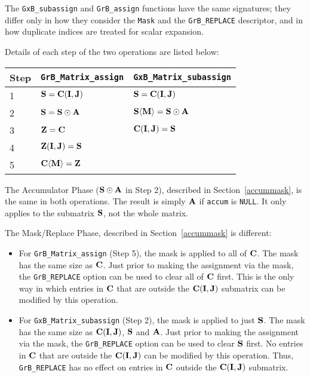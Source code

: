 \documentclass[12pt]{article}
\begin{document}
The \verb'GxB_subassign' and \verb'GrB_assign' functions have the same
signatures; they differ only in how they consider the \verb'Mask' and the
\verb'GrB_REPLACE' descriptor, and in how duplicate indices are treated for
scalar expansion.

Details of each step of the two operations are listed below:

\vspace{0.1in}
\begin{tabular}{lll}
\hline
Step & \verb'GrB_Matrix_assign'                & \verb'GxB_Matrix_subassign'                        \\
\hline
1 & ${\bf S} = {\bf C(I,J)}$                & ${\bf S} = {\bf C(I,J)}$                              \\
2 & ${\bf S} = {\bf S} \odot {\bf A}$       & ${\bf S \langle M \rangle} = {\bf S} \odot {\bf A}$   \\
3 & ${\bf Z} = {\bf C}$                     & ${\bf C(I,J)}= {\bf S}$                               \\ 
4 & ${\bf Z(I,J)} = {\bf S}$                &                                                       \\
5 & ${\bf C \langle M \rangle = Z}$         &                                                       \\
\hline
\end{tabular}
\vspace{0.1in}

The Accumulator Phase (${\bf S} \odot {\bf A}$ in Step 2), described in
Section~\ref{accummask}, is the same in both operations.  The result is simply
${\bf A}$ if \verb'accum' is \verb'NULL'.  It only applies to the submatrix
${\bf S}$, not the whole matrix.

The Mask/Replace Phase, described in Section~\ref{accummask} is different:
\begin{itemize}
\item
    For \verb'GrB_Matrix_assign' (Step 5), the mask is applied to all of ${\bf
    C}$.  The mask has the same size as ${\bf C}$.  Just prior to making the
    assignment via the mask, the \verb'GrB_REPLACE' option can be used to clear
    all of ${\bf C}$ first.  This is the only way in which entries in ${\bf C}$ that
    are outside the ${\bf C(I,J)}$ submatrix can be modified by this operation.

\item
    For \verb'GxB_Matrix_subassign' (Step 2), the mask is applied to just ${\bf
    S}$.  The mask has the same size as ${\bf C(I,J)}$, ${\bf S}$ and ${\bf A}$.
    Just prior to making the assignment via the mask, the \verb'GrB_REPLACE'
    option can be used to clear ${\bf S}$ first.  No entries in ${\bf C}$ that
    are outside the ${\bf C(I,J)}$ can be modified by this operation.  Thus,
    \verb'GrB_REPLACE' has no effect on entries in ${\bf C}$ outside the
    ${\bf C(I,J)}$ submatrix.

\end{itemize}
\end{document}
